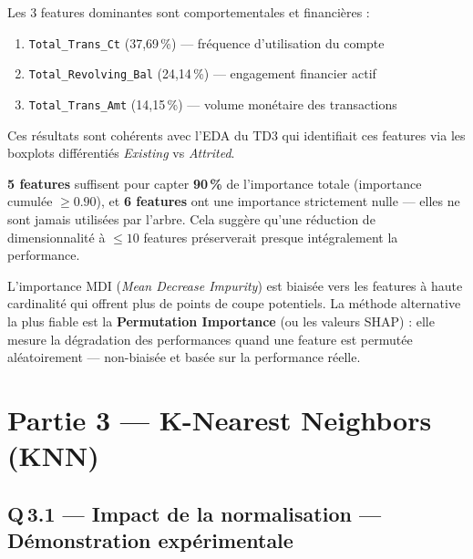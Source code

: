 \documentclass[12pt,a4paper]{article}
\newcommand{\feature}[1]{\texttt{\small #1}}
\begin{document}
\begin{reponsebox}
Les 3 features dominantes sont comportementales et financières :
\begin{enumerate}[noitemsep]
  \item \feature{Total\_Trans\_Ct} (37,69\,\%) — fréquence d'utilisation du compte
  \item \feature{Total\_Revolving\_Bal} (24,14\,\%) — engagement financier actif
  \item \feature{Total\_Trans\_Amt} (14,15\,\%) — volume monétaire des transactions
\end{enumerate}
Ces résultats sont cohérents avec l'EDA du TD3 qui identifiait ces features
via les boxplots différentiés \emph{Existing} vs \emph{Attrited}.
\end{reponsebox}

\begin{reponsebox}
\textbf{5 features} suffisent pour capter \textbf{90\,\%} de l'importance totale
(importance cumulée $\geq 0.90$), et \textbf{6 features} ont une importance strictement
nulle — elles ne sont jamais utilisées par l'arbre. Cela suggère qu'une réduction
de dimensionnalité à $\leq 10$ features préserverait presque intégralement la performance.
\end{reponsebox}

\begin{reponsebox}
L'importance MDI (\emph{Mean Decrease Impurity}) est biaisée vers les features
à haute cardinalité qui offrent plus de points de coupe potentiels.
La méthode alternative la plus fiable est la \textbf{Permutation Importance}
(ou les valeurs SHAP) : elle mesure la dégradation des performances quand
une feature est permutée aléatoirement — non-biaisée et basée sur la performance réelle.
\end{reponsebox}

\section{Partie 3 — K-Nearest Neighbors (KNN)}

\subsection{Q\,3.1 — Impact de la normalisation — Démonstration expérimentale}
\end{document}
